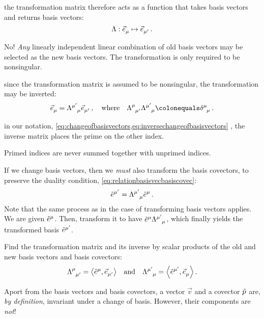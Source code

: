  the transformation matrix therefore acts as a function that takes basis vectors and returns basis vectors:
%
\begin{equation*}
  \fdmap{\transmat}{\tbvec\mu}{\tbvec{\aidx\mu}}\,.
\end{equation*}

 No! \emph{Any} linearly independent linear combination of old basis vectors may be selected as the new basis vectors. The transformation is only required to be nonsingular.

 since the transformation matrix is assumed to be nonsingular, the transformation may be inverted:
%
\begin{equation}\label{eq:inversechangeofbasisvectors}
  \tbvec\mu = \ttransmat{\aidx\mu}{\mu}\tbvec{\aidx\mu}\,,\quad\text{where}\quad
  \ttransmat{\mu}{\aidx\mu}\ttransmat{\aidx\mu}{\mu} \defas\tkron\mu\mu\,.
\end{equation}

 in our notation, \cref{eq:changeofbasisvectors,eq:inversechangeofbasisvectors} , the inverse matrix places the prime on the other index.

 Primed indices are never summed together with unprimed indices.

 If we change basis vectors, then we \emph{must} also transform the basis covectors, to preserve the duality condition, \cref{eq:relationbasisvecbasiscovec}:
%
\begin{equation}\label{eq:transformationofdualbasis}
  \tbcov{\aidx\mu} = \ttransmat{\aidx\mu}{\mu}\tbcov\mu\,.
\end{equation}
%
Note that the same process as in the case of transforming basis vectors applies. We are given $\tbcov\mu$. Then, transform it to have $\tbcov\mu\ttransmat{\aidx\mu}{\mu}$, which finally yields the transformed basis $\tbcov{\aidx\mu}$.

 Find the transformation matrix and its inverse by scalar products of the old and new basis vectors and basis covectors:
%
\begin{equation}\label{eq:transformationmatrixfromscalarproducts}
  \ttransmat\mu{\aidx\mu} = \sprod{\tbcov\mu}{\tbvec{\aidx\mu}}\quad\text{and}\quad
  \ttransmat{\aidx\mu}\mu = \sprod{\tbcov{\aidx\mu}}{\tbvec\mu}\,.
\end{equation}

 Aport from the basis vectors and basis covectors, a vector $\vec v$ and a covector $\tilde{p}$ are, \emph{by definition}, invariant under a change of basis. However, their components are \emph{not}! 

